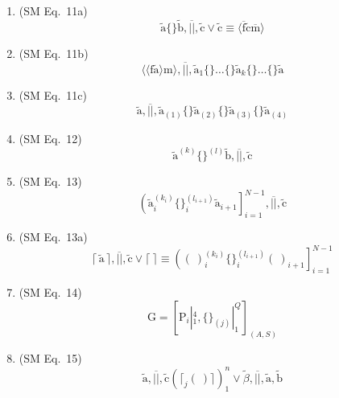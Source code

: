 \documentclass[12pt]{article}
\begin{document}
\begin{enumerate}[label=(\arabic*), series=formellist]
    \item (SM Eq.\ 11a) 
    \[
    \tilde{\mathrm{a}} \{ \} \tilde{\mathrm{b}}, \overline{||}, \tilde{\mathrm{c}} \lor \tilde{\mathrm{c}} \equiv \langle \overline{\mathrm{f}} \tilde{\mathrm{c}} \overline{\mathrm{m}} \rangle
    \]

    \item (SM Eq.\ 11b) 
    \[
    \langle\langle \mathrm{f} \tilde{\mathrm{a}} \rangle \mathrm{m} \rangle, \overline{||}, \tilde{\mathrm{a}}_1 \{ \} \dots \{ \} \tilde{\mathrm{a}}_k \{ \} \dots \{ \} \tilde{\mathrm{a}}
    \]

    \item (SM Eq.\ 11c) 
    \[
    \tilde{\mathrm{a}}, \overline{||}, \tilde{\mathrm{a}}_{(1)} \{ \} \tilde{\mathrm{a}}_{(2)} \{ \} \tilde{\mathrm{a}}_{(3)} \{ \} \tilde{\mathrm{a}}_{(4)}
    \]

    \item (SM Eq.\ 12) 
    \[
    \tilde{\mathrm{a}}^{(k)} \{ \}^{(l)} \tilde{\mathrm{b}}, \overline{||}, \tilde{\mathrm{c}}
    \]

    \item (SM Eq.\ 13) 
    \[
    \left( \tilde{\mathrm{a}}_i^{(k_i)} \{ \}_i^{(l_{i+1})} \tilde{\mathrm{a}}_{i+1} \right]_{i=1}^{N-1}, \overline{||}, \tilde{\mathrm{c}}
    \]

    \item (SM Eq.\ 13a) 
    \[
    \lceil \, \tilde{\mathrm{a}} \, \rceil, \overline{||}, \tilde{\mathrm{c}} \lor \lceil \ \rceil \equiv \left( (\ )_i^{(k_i)} \{ \}_i^{(l_{i+1})} (\ )_{i+1} \right]_{i=1}^{N-1}
    \]

    \item (SM Eq.\ 14) 
    \[
    \mathrm{G} = \left[ \mathrm{P}_i |_1^4, \{ \}_{(j)} |_1^Q \right]_{(A, S)}
    \]

    \item (SM Eq.\ 15) 
    \[
    \tilde{\mathrm{a}}, \overline{||}, \tilde{\mathrm{c}} \left( \lceil_j (\ ) \rceil \right)_1^n \lor \tilde{\beta}, \overline{||}, \tilde{\mathrm{a}}, \tilde{\mathrm{b}}
    \]


\end{enumerate}
\end{document}
